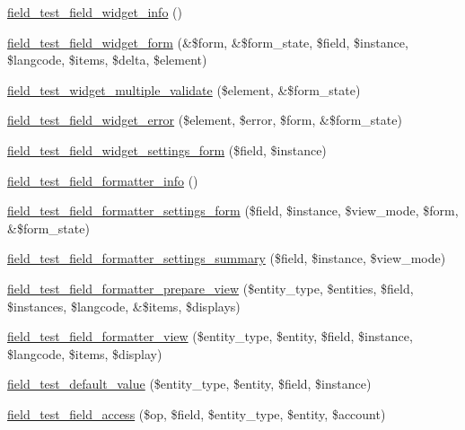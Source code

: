 \begin{DoxyCompactItemize}
\item 
\hyperlink{field__test_8field_8inc_aef7269d23d6ee771fbc46a8968aa9ea7}{field\_\-test\_\-field\_\-widget\_\-info} ()
\item 
\hyperlink{field__test_8field_8inc_a1a22b6a97809922fb5bc7d12073b822b}{field\_\-test\_\-field\_\-widget\_\-form} (\&\$form, \&\$form\_\-state, \$field, \$instance, \$langcode, \$items, \$delta, \$element)
\item 
\hyperlink{field__test_8field_8inc_a70d1c2945ba7186118c0ddf76ac27117}{field\_\-test\_\-widget\_\-multiple\_\-validate} (\$element, \&\$form\_\-state)
\item 
\hyperlink{field__test_8field_8inc_ae8db48aaa8ee647e1b47a88ad7d15279}{field\_\-test\_\-field\_\-widget\_\-error} (\$element, \$error, \$form, \&\$form\_\-state)
\item 
\hyperlink{field__test_8field_8inc_a154d213069decb27ac326b793a957530}{field\_\-test\_\-field\_\-widget\_\-settings\_\-form} (\$field, \$instance)
\item 
\hyperlink{field__test_8field_8inc_a538bb04b725628518604eece404ab6dc}{field\_\-test\_\-field\_\-formatter\_\-info} ()
\item 
\hyperlink{field__test_8field_8inc_aae6632286258431d3932e251212026d3}{field\_\-test\_\-field\_\-formatter\_\-settings\_\-form} (\$field, \$instance, \$view\_\-mode, \$form, \&\$form\_\-state)
\item 
\hyperlink{field__test_8field_8inc_ad80cc548d9fa0d3998c09fe7e60f224a}{field\_\-test\_\-field\_\-formatter\_\-settings\_\-summary} (\$field, \$instance, \$view\_\-mode)
\item 
\hyperlink{field__test_8field_8inc_aaf187b49a05422065c4df4e596d4b8a4}{field\_\-test\_\-field\_\-formatter\_\-prepare\_\-view} (\$entity\_\-type, \$entities, \$field, \$instances, \$langcode, \&\$items, \$displays)
\item 
\hyperlink{field__test_8field_8inc_a6a36c6ce525d35e0e3e70e00b154f491}{field\_\-test\_\-field\_\-formatter\_\-view} (\$entity\_\-type, \$entity, \$field, \$instance, \$langcode, \$items, \$display)
\item 
\hyperlink{field__test_8field_8inc_a834998133c15e2eb1ddb7b83207036ee}{field\_\-test\_\-default\_\-value} (\$entity\_\-type, \$entity, \$field, \$instance)
\item 
\hyperlink{field__test_8field_8inc_ab4f4196918d254f1afe36c9de8433267}{field\_\-test\_\-field\_\-access} (\$op, \$field, \$entity\_\-type, \$entity, \$account)
\end{DoxyCompactItemize}


